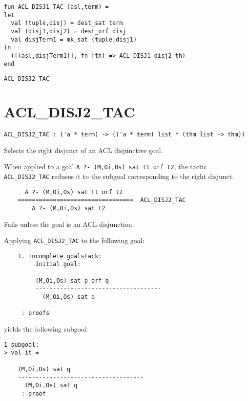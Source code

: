 \IMPLEMENTATION
\begin{holboxed}
\begin{verbatim}
fun ACL_DISJ1_TAC (asl,term) =
let
  val (tuple,disj) = dest_sat term
  val (disj1,disj2) = dest_orf disj
  val disjTerm1 = mk_sat (tuple,disj1)
in
  ([(asl,disjTerm1)], fn [th] => ACL_DISJ1 disj2 th)
end
\end{verbatim}
\end{holboxed}

\SEEALSO
\texttt{ACL\_DISJ2\_TAC}
\ENDDOC

\section{ACL\_DISJ2\_TAC}



\small{
\begin{lstlisting}[breaklines]
ACL_DISJ2_TAC : ('a * term) -> (('a * term) list * (thm list -> thm))
\end{lstlisting}}\egroup


\SYNOPSIS
Selects the right disjunct of an ACL disjunctive goal.

\DESCRIBE When applied to a goal \texttt{A ?- (M,Oi,Os) sat t1 orf t2}, the tactic \texttt{ACL\_DISJ2\_TAC} reduces it to the subgoal corresponding to the right disjunct.
\begin{verbatim}
      A ?- (M,Oi,Os) sat t1 orf t2
    =================================  ACL_DISJ2_TAC
        A ?- (M,Oi,Os) sat t2
\end{verbatim}

\FAILURE 
Fails unless the goal is an ACL disjunction.

\EXAMPLE
Applying \texttt{ACL\_DISJ2\_TAC} to the following goal:
\begin{holboxed}
\begin{verbatim}
    1. Incomplete goalstack:
         Initial goal:
    
         (M,Oi,Os) sat p orf q
         ------------------------------------
           (M,Oi,Os) sat q
    
     : proofs
\end{verbatim}
\end{holboxed}
yields the following subgoal:
\begin{holboxed}
\begin{verbatim}
1 subgoal:
> val it =
    
    (M,Oi,Os) sat q
    ------------------------------------
      (M,Oi,Os) sat q
     : proof
\end{verbatim}
\end{holboxed}

